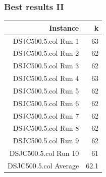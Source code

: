 \documentclass{beamer}
\begin{document}
\begin{frame}
    \frametitle{Best results II}

       \begin{table}
         \begin{tabular}{r | r  }

           \hline
           Instance & k  \\
           \hline \hline 

           DSJC500.5.col Run 1 & 63 \\
           DSJC500.5.col Run 2 & 62 \\
           DSJC500.5.col Run 3 & 62 \\
           DSJC500.5.col Run 4 & 63 \\
           DSJC500.5.col Run 5 & 62 \\
           DSJC500.5.col Run 6 & 62 \\
           DSJC500.5.col Run 7 & 62 \\
           DSJC500.5.col Run 8 & 62 \\
           DSJC500.5.col Run 9 & 62 \\
           DSJC500.5.col Run 10 & 61 \\
           DSJC500.5.col Average & 62.1 \\ 
           \hline
         \end{tabular}
       \end{table}

   

  \end{frame}
\end{document}
